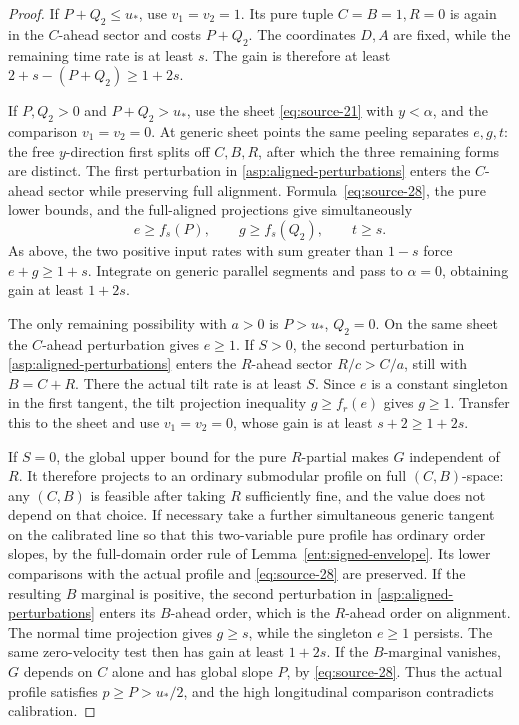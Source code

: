 \begin{proof}
If \(P+Q_2\le u_*\), use \(v_1=v_2=1\). Its pure tuple
\(C=B=1,R=0\) is again in the \(C\)-ahead sector and
costs \(P+Q_2\). The coordinates \(D,A\) are fixed,
while the remaining time rate is at least \(s\). The gain
is therefore at least \(2+s-(P+Q_2)\ge1+2s\).

If \(P,Q_2>0\) and \(P+Q_2>u_*\), use the sheet
\eqref{eq:source-21} with \(y<\alpha\), and the comparison
\(v_1=v_2=0\). At generic sheet points the same peeling
separates \(e,g,t\): the free \(y\)-direction first splits
off \(C,B,R\), after which the three remaining forms are
distinct. The first perturbation in \eqref{asp:aligned-perturbations}
enters the \(C\)-ahead sector while preserving full alignment.
Formula~\eqref{eq:source-28}, the pure lower bounds,
and the full-aligned projections give simultaneously
\[
e\ge f_s(P),\qquad g\ge f_s(Q_2),\qquad t\ge s.
\]
As above, the two positive input rates with sum greater than
\(1-s\) force \(e+g\ge1+s\). Integrate on generic
parallel segments and pass to \(\alpha=0\), obtaining gain
at least \(1+2s\).

The only remaining possibility with \(a>0\) is
\(P>u_*\), \(Q_2=0\). On the same sheet the
\(C\)-ahead perturbation gives \(e\ge1\).
If \(S>0\), the second perturbation in
\eqref{asp:aligned-perturbations} enters the \(R\)-ahead sector
\(R/c>C/a\), still with \(B=C+R\). There the actual
tilt rate is at least \(S\). Since \(e\) is a constant
singleton in the first tangent, the tilt projection inequality
\(g\ge f_r(e)\) gives \(g\ge1\). Transfer this to the
sheet and use \(v_1=v_2=0\), whose gain is at least
\(s+2\ge1+2s\).

If \(S=0\), the global upper bound for the pure \(R\)-partial makes \(G\)
independent of \(R\). It therefore projects to an ordinary
submodular profile on full \((C,B)\)-space: any \((C,B)\)
is feasible after taking \(R\) sufficiently fine, and the
value does not depend on that choice. If necessary take a further
simultaneous generic tangent on the calibrated line so that this
two-variable pure profile has ordinary order slopes, by the
full-domain order rule of Lemma~\ref{ent:signed-envelope}.
Its lower comparisons with the actual profile and
\eqref{eq:source-28} are preserved. If the resulting \(B\)
marginal is positive, the second perturbation in
\eqref{asp:aligned-perturbations} enters its \(B\)-ahead
order, which is the \(R\)-ahead order on alignment. The
normal time projection gives \(g\ge s\), while the
singleton \(e\ge1\) persists. The same zero-velocity test
then has gain at least \(1+2s\). If the \(B\)-marginal
vanishes, \(G\) depends on \(C\) alone and has global
slope \(P\), by \eqref{eq:source-28}. Thus the actual
profile satisfies \(p\ge P>u_*/2\), and the high
longitudinal comparison contradicts calibration.


\end{proof}
